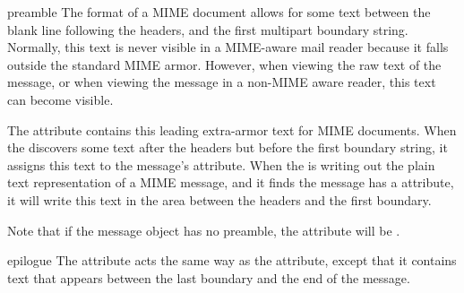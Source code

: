 \begin{datadesc}{preamble}
The format of a MIME document allows for some text between the blank
line following the headers, and the first multipart boundary string.
Normally, this text is never visible in a MIME-aware mail reader
because it falls outside the standard MIME armor.  However, when
viewing the raw text of the message, or when viewing the message in a
non-MIME aware reader, this text can become visible.

The  attribute contains this leading extra-armor text
for MIME documents.  When the  discovers some text after
the headers but before the first boundary string, it assigns this text
to the message's  attribute.  When the 
is writing out the plain text representation of a MIME message, and it
finds the message has a  attribute, it will write this
text in the area between the headers and the first boundary.

Note that if the message object has no preamble, the
 attribute will be .
\end{datadesc}

\begin{datadesc}{epilogue}
The  attribute acts the same way as the 
attribute, except that it contains text that appears between the last
boundary and the end of the message.
\end{datadesc}
